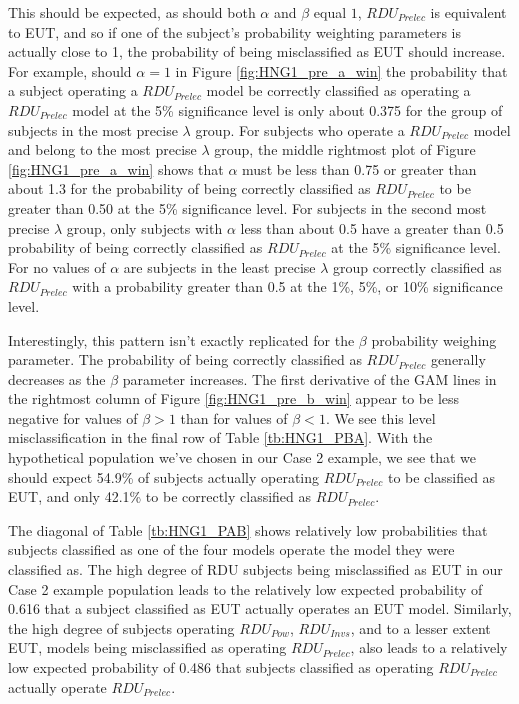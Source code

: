 \documentclass[../main.tex]{subfiles}
\begin{document}
This should be expected, as should both $\alpha$ and $\beta$ equal $1$, $\mathit{RDU_{Prelec}}$ is equivalent to EUT, and so if one of the subject's probability weighting parameters is actually close to 1, the probability of being misclassified as EUT should increase.
For example, should $\alpha = 1$ in Figure \ref{fig:HNG1_pre_a_win} the probability that a subject operating a $\mathit{RDU_{Prelec}}$ model be correctly classified as operating a $\mathit{RDU_{Prelec}}$ model at the 5\% significance level is only about 0.375 for the group of subjects in the most precise $\lambda$ group.
For subjects who operate a $\mathit{RDU_{Prelec}}$ model and belong to the most precise $\lambda$ group, the middle rightmost plot of Figure \ref{fig:HNG1_pre_a_win} shows that $\alpha$ must be less than 0.75 or greater than about 1.3 for the probability of being correctly classified as $\mathit{RDU_{Prelec}}$ to be greater than 0.50 at the 5\% significance level.
For subjects in the second most precise $\lambda$ group, only subjects with $\alpha$ less than about 0.5 have a greater than 0.5 probability of being correctly classified as $\mathit{RDU_{Prelec}}$ at the 5\% significance level.
For no values of $\alpha$ are subjects in the least precise $\lambda$ group correctly classified as $\mathit{RDU_{Prelec}}$ with a probability greater than 0.5 at the 1\%, 5\%, or 10\% significance level.

Interestingly, this pattern isn't exactly replicated for the $\beta$ probability weighing parameter.
The probability of being correctly classified as $\mathit{RDU_{Prelec}}$ generally decreases as the $\beta$ parameter increases.
The first derivative of the GAM lines in the rightmost column of Figure \ref{fig:HNG1_pre_b_win} appear to be less negative for values of $\beta > 1$ than for values of $\beta < 1$.
We see this level misclassification in the final row of Table \ref{tb:HNG1_PBA}.
With the hypothetical population we've chosen in our Case 2 example, we see that we should expect 54.9\% of subjects actually operating $\mathit{RDU_{Prelec}}$ to be classified as EUT, and only 42.1\% to be correctly classified as $\mathit{RDU_{Prelec}}$.

The diagonal of Table \ref{tb:HNG1_PAB} shows relatively low probabilities that subjects classified as one of the four models operate the model they were classified as.
The high degree of RDU subjects being misclassified as EUT in our Case 2 example population leads to the relatively low expected probability of 0.616 that a subject classified as EUT actually operates an EUT model.
Similarly, the high degree of subjects operating $\mathit{RDU_{Pow}}$, $\mathit{RDU_{Invs}}$, and to a lesser extent EUT, models being misclassified as operating $\mathit{RDU_{Prelec}}$, also leads to a relatively low expected probability of 0.486 that subjects classified as operating $\mathit{RDU_{Prelec}}$ actually operate $\mathit{RDU_{Prelec}}$.
\end{document}
